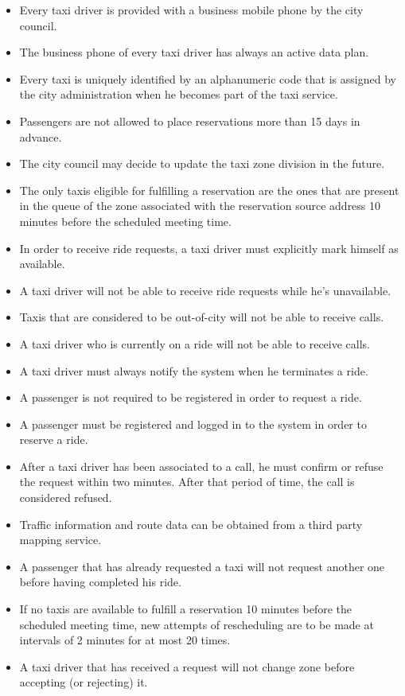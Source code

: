 \begin{itemize}
\item Every taxi driver is provided with a business mobile phone by the city council.
\item The business phone of every taxi driver has always an active data plan.
\item Every taxi is uniquely identified by an alphanumeric code that is assigned by the city administration when he becomes part of the taxi service.
\item Passengers are not allowed to place reservations more than 15 days in advance. 
\item The city council may decide to update the taxi zone division in the future. 
\item The only taxis eligible for fulfilling a reservation are the ones that are present in the queue of the zone associated with the reservation source address 10 minutes before the scheduled meeting time.
\item In order to receive ride requests, a taxi driver must explicitly mark himself as available.
\item A taxi driver will not be able to receive ride requests while he's unavailable.
\item Taxis that are considered to be out-of-city will not be able to receive calls.
\item A taxi driver who is currently on a ride will not be able to receive calls.
\item A taxi driver must always notify the system when he terminates a ride. 
\item A passenger is not required to be registered in order to request a ride.
\item A passenger must be registered and logged in to the system in order to reserve a ride.
\item After a taxi driver has been associated to a call, he must confirm or refuse the request within two minutes. After that period of time, the call is considered refused. 
\item Traffic information and route data can be obtained from a third party mapping service.
\item A passenger that has already requested a taxi will not request another one before having completed his ride.
\item If no taxis are available to fulfill a reservation 10 minutes before the scheduled meeting time, new attempts of rescheduling are to be made at intervals of 2 minutes for at most 20 times.
\item A taxi driver that has received a request will not change zone before accepting (or rejecting) it.
\end{itemize}